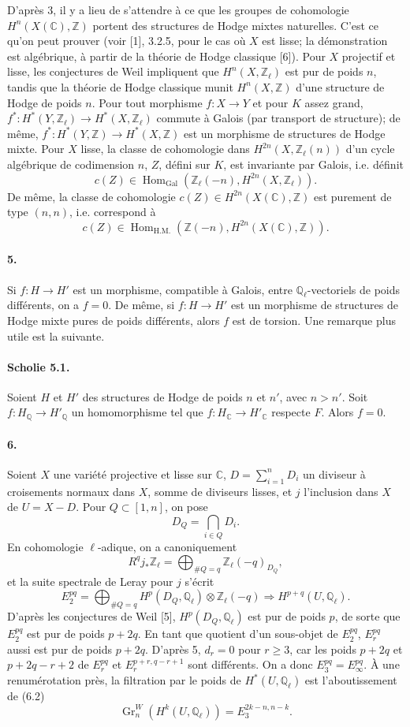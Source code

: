 \documentclass[10pt]{article}
\newcommand{\C}{\mathbb C}
\newcommand{\Q}{\mathbb Q}
\newcommand{\Z}{\mathbb Z}
\newcommand{\Ql}{\mathbb Q_\ell}
\newcommand{\Zl}{\mathbb Z_\ell}
\newcommand{\Gr}{\operatorname{Gr}}
\newcommand{\Gal}{\operatorname{Gal}}
\newcommand{\Hom}{\operatorname{Hom}}
\begin{document}
D'après 3, il y a lieu de s'attendre à ce que les groupes de cohomologie $H^n(X(\C),\Z)$ portent des structures de Hodge mixtes naturelles. C'est ce qu'on peut prouver (voir [1], 3.2.5, pour le cas où $X$ est lisse; la démonstration est algébrique, à partir de la théorie de Hodge classique [6]). Pour $X$ projectif et lisse, les conjectures de Weil impliquent que $H^n(X,\Zl)$ est pur de poids $n$, tandis que la théorie de Hodge classique munit $H^n(X,\Z)$ d'une structure de Hodge de poids $n$. Pour tout morphisme $f:X\to Y$ et pour $K$ assez grand, $f^*:H^*(Y,\Zl)\to H^*(X,\Zl)$ commute à Galois (par transport de structure); de même, $f^*:H^*(Y,\Z)\to H^*(X,\Z)$ est un morphisme de structures de Hodge mixte. Pour $X$ lisse, la classe de cohomologie dans $H^{2n}(X,\Zl(n))$ d'un cycle algébrique de codimension $n$, $Z$, défini sur $K$, est invariante par Galois, i.e. définit
\[
c(Z)\in\Hom_{\Gal}(\Zl(-n),H^{2n}(X,\Zl)).
\]
De même, la classe de cohomologie $c(Z)\in H^{2n}(X(\C),\Z)$ est purement de type $(n,n)$, i.e. correspond à
\[
c(Z)\in\Hom_{\mathrm{H.M.}}(\Z(-n),H^{2n}(X(\C),\Z)).
\]

\paragraph{5.} Si $f:H\to H'$ est un morphisme, compatible à Galois, entre $\Ql$-vectoriels de poids différents, on a $f=0$. De même, si $f:H\to H'$ est un morphisme de structures de Hodge mixte pures de poids différents, alors $f$ est de torsion. Une remarque plus utile est la suivante.

\paragraph{Scholie 5.1.} Soient $H$ et $H'$ des structures de Hodge de poids $n$ et $n'$, avec $n>n'$. Soit $f:H_\Q\to H'_\Q$ un homomorphisme tel que $f:H_\C\to H'_\C$ respecte $F$. Alors $f=0$.

\paragraph{6.} Soient $X$ une variété projective et lisse sur $\C$, $D=\sum_{i=1}^n D_i$ un diviseur à croisements normaux dans $X$, somme de diviseurs lisses, et $j$ l'inclusion dans $X$ de $U=X-D$. Pour $Q\subset[1,n]$, on pose
\[
D_Q=\bigcap_{i\in Q}D_i.
\]
En cohomologie $\ell$-adique, on a canoniquement
\[
\tag{6.1}
R^qj_*\Zl=\bigoplus_{\#Q=q}\Zl(-q)_{D_Q},
\]
et la suite spectrale de Leray pour $j$ s'écrit
\[
\tag{6.2}
E_2^{pq}=\bigoplus_{\#Q=q}H^p(D_Q,\Ql)\otimes\Zl(-q)\Rightarrow H^{p+q}(U,\Ql).
\]
D'après les conjectures de Weil [5], $H^p(D_Q,\Ql)$ est pur de poids $p$, de sorte que $E_2^{pq}$ est pur de poids $p+2q$. En tant que quotient d'un sous-objet de $E_2^{pq}$, $E_r^{pq}$ aussi est pur de poids $p+2q$. D'après 5, $d_r=0$ pour $r\ge3$, car les poids $p+2q$ et $p+2q-r+2$ de $E_r^{pq}$ et $E_r^{p+r,q-r+1}$ sont différents. On a donc $E_3^{pq}=E_\infty^{pq}$. À une renumérotation près, la filtration par le poids de $H^*(U,\Ql)$ est l'aboutissement de (6.2)
\[
\tag{6.3}
\Gr_n^W(H^k(U,\Ql))=E_3^{2k-n,n-k}.
\]
\end{document}
